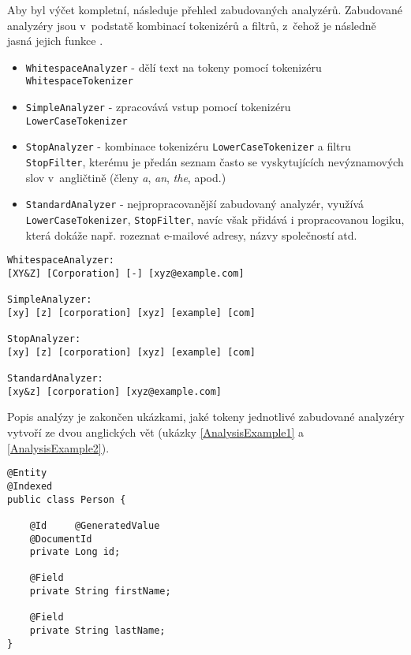 \documentclass[11pt,oneside]{fithesis2}
\begin{document}
Aby byl výčet kompletní, následuje přehled zabudovaných analyzérů. Zabudované analyzéry jsou v~podstatě kombinací tokenizérů a filtrů, z~čehož je následně jasná jejich funkce  \cite[s.~112]{LuceneAction}.

\begin{itemize}
	\item \texttt{WhitespaceAnalyzer} - dělí text na tokeny pomocí tokenizéru \\ \texttt{WhitespaceTokenizer}
	\item \texttt{SimpleAnalyzer} - zpracovává vstup pomocí tokenizéru \\ \texttt{LowerCaseTokenizer}
	\item \texttt{StopAnalyzer} - kombinace tokenizéru \texttt{LowerCaseTokenizer} a filtru \texttt{StopFilter}, kterému je předán seznam často se vyskytujících nevýznamových slov v~angličtině (členy \emph{a}, \emph{an}, \emph{the}, apod.)
	\item \texttt{StandardAnalyzer} - nejpropracovanější zabudovaný analyzér, využívá \texttt{LowerCaseTokenizer}, \texttt{StopFilter}, navíc však přidává i propracovanou logiku, která dokáže např. rozeznat e-mailové adresy, názvy společností atd.
\end{itemize}

\begin{lstlisting}[caption =  Použití zabudovaných analyzérů pro větu {\emph{\uv{XY\&Z Corporation - xyz@example.com}}}{,} převzato z~{\cite[str. 112]{LuceneAction}} , label = AnalysisExample2]
WhitespaceAnalyzer:
[XY&Z] [Corporation] [-] [xyz@example.com]

SimpleAnalyzer:
[xy] [z] [corporation] [xyz] [example] [com]

StopAnalyzer:
[xy] [z] [corporation] [xyz] [example] [com]

StandardAnalyzer:
[xy&z] [corporation] [xyz@example.com]
\end{lstlisting}

Popis analýzy je zakončen ukázkami, jaké tokeny jednotlivé zabudované analyzéry vytvoří ze dvou anglických vět (ukázky \ref{AnalysisExample1} a \ref{AnalysisExample2}).

\newpage

\begin{lstlisting}[caption =  Zpřístupnění entity pro vyhledávání v~Hibernate Search, label = ExampleHibernateSearch]
@Entity
@Indexed
public class Person {

	@Id 	@GeneratedValue
	@DocumentId
	private Long id;

	@Field
	private String firstName;

	@Field 
	private String lastName;
}
\end{lstlisting}
\end{document}
